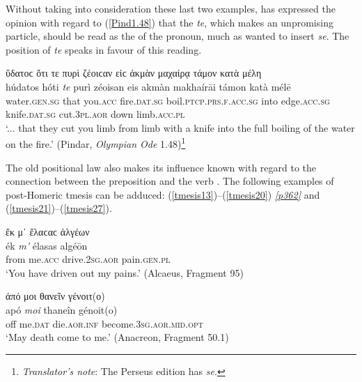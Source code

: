 Without taking into consideration these last two examples, \citet[4f.]{Christ1891} has expressed the opinion with regard to (\ref{Pind1.48}) that the \textit{te}, which makes an unpromising particle, should be read as the  of the pronoun, much as \citet[17]{Bergk1866} wanted to insert \textit{se}. The position of \textit{te} speaks in favour of this reading.

\begin{exe}
\ex ὕδατοϲ ὅτι τε πυρὶ ζέοιϲαν εἰϲ ἀκμὰν μαχαίρᾳ τάμον κατὰ μέλη\\
\gll húdatos hóti \emph{te} purì zéoisan eis akmàn makhaírāi támon katà mélē\\
water.\textsc{gen.sg} that you.\textsc{acc} fire.\textsc{dat.sg}
boil.\textsc{ptcp.prs.f.acc.sg} into edge.\textsc{acc.sg} knife.\textsc{dat.sg} cut.\textsc{3pl.aor} down limb.\textsc{acc.pl}\\
\trans `... that they cut you limb from limb with a knife into the full boiling of the water on the fire.' (Pindar, \textit{Olympian Ode} 1.48)\footnote{\emph{Translator's note}: The Perseus edition has \textit{se}.}
\label{Pind1.48}
\end{exe}

The old positional law also makes its influence known with regard to the connection between the preposition and the verb\label{VPtmesis} \citep[§68.48.3]{Krueger1871}. The following examples of post-Homeric tmesis can be adduced: (\ref{tmesis13})--(\ref{tmesis20}) \hyperlink{p362}{\emph{[p362]}} and (\ref{tmesis21})--(\ref{tmesis27}).

\begin{exe}
\ex ἔκ μ᾽ ἔλαϲαϲ ἀλγέων\\
\gll ék \emph{m'} élasas algéōn\\
from me.\textsc{acc} drive.\textsc{2sg.aor} pain.\textsc{gen.pl}\\
\trans `You have driven out my pains.' (Alcaeus, Fragment 95)
\label{tmesis13}
\end{exe}

\begin{exe}
\ex ἀπό μοι θανεῖν γένοιτ(ο)\\
\gll apó \emph{moi} thaneîn génoit(o)\\
off me.\textsc{dat} die.\textsc{aor.inf}
become.\textsc{3sg.aor.mid.opt}\\
\trans `May death come to me.' (Anacreon, Fragment 50.1)
\label{tmesis14}
\end{exe}

